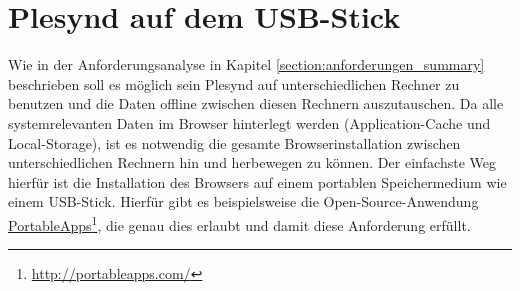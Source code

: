 \section{Plesynd auf dem USB-Stick}
Wie in der Anforderungsanalyse in Kapitel \ref{section:anforderungen_summary} beschrieben soll es möglich sein Plesynd auf unterschiedlichen Rechner zu benutzen und die Daten offline zwischen diesen Rechnern auszutauschen. Da alle systemrelevanten Daten im Browser hinterlegt werden (Application-Cache und Local-Storage), ist es notwendig die gesamte Browserinstallation zwischen unterschiedlichen Rechnern hin und herbewegen zu können. Der einfachste Weg hierfür ist die Installation des Browsers auf einem portablen Speichermedium wie einem USB-Stick. Hierfür gibt es beispielsweise die Open-Source-Anwendung \href{http://portableapps.com/}{PortableApps}\footnote{\url{http://portableapps.com/}}, die genau dies erlaubt und damit diese Anforderung erfüllt.





